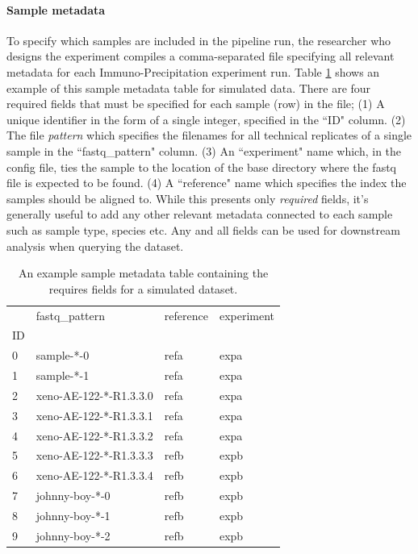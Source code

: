 \documentclass{article}
\begin{document}
\paragraph{Sample metadata}
To specify which samples are included in the pipeline run, 
the researcher who designs the experiment compiles a comma-separated file specifying all relevant metadata for each Immuno-Precipitation experiment run. 
Table \ref{tab:sample_metadata} shows an example of this sample metadata table for simulated data.
There are four required fields that must be specified for each sample (row) in the file;
(1) A unique identifier in the form of a single integer, specified in the ``ID" column.
(2) The file \textit{pattern} which specifies the filenames for all technical replicates of a single sample in the ``fastq\_pattern" column.
(3) An ``experiment" name which, in the config file, ties the sample to the location of the base directory where the fastq file is expected to be found.
(4) A ``reference" name which specifies the index the samples should be aligned to.
While this presents only \textit{required} fields, it's generally useful to add any other relevant metadata connected to each sample such as sample type, species etc.
Any and all fields can be used for downstream analysis when querying the dataset. 

\begin{table}[h!!!!]
\centering
\begin{tabular}{llll}
\toprule
{} &           fastq\_pattern & reference & experiment \\
ID &                         &           &            \\
\midrule
0  &              sample-*-0 &      refa &       expa \\
1  &              sample-*-1 &      refa &       expa \\
2  &  xeno-AE-122-*-R1.3.3.0 &      refa &       expa \\
3  &  xeno-AE-122-*-R1.3.3.1 &      refa &       expa \\
4  &  xeno-AE-122-*-R1.3.3.2 &      refa &       expa \\
5  &  xeno-AE-122-*-R1.3.3.3 &      refb &       expb \\
6  &  xeno-AE-122-*-R1.3.3.4 &      refb &       expb \\
7  &          johnny-boy-*-0 &      refb &       expb \\
8  &          johnny-boy-*-1 &      refb &       expb \\
9  &          johnny-boy-*-2 &      refb &       expb \\
\bottomrule
\end{tabular}
\caption{An example sample metadata table containing the requires fields for a simulated dataset.}
\label{tab:sample_metadata}
\end{table}
\end{document}
